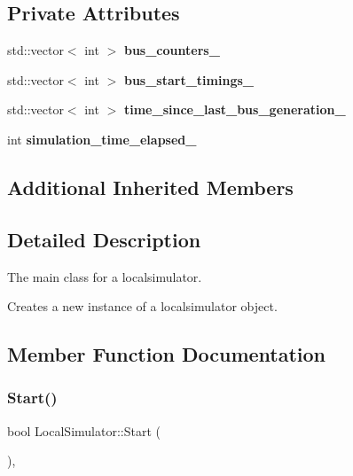 \subsection*{Private Attributes}
\begin{DoxyCompactItemize}
\item 
\mbox{\label{classLocalSimulator_a1c92b8c58df2b015753bd451bc469299}} 
std\+::vector$<$ int $>$ {\bfseries bus\+\_\+counters\+\_\+}
\item 
\mbox{\label{classLocalSimulator_afe5ff08ca4c982f774b6f924e2844689}} 
std\+::vector$<$ int $>$ {\bfseries bus\+\_\+start\+\_\+timings\+\_\+}
\item 
\mbox{\label{classLocalSimulator_a161826601c14be88063cb8b2d1bee552}} 
std\+::vector$<$ int $>$ {\bfseries time\+\_\+since\+\_\+last\+\_\+bus\+\_\+generation\+\_\+}
\item 
\mbox{\label{classLocalSimulator_a1acd308212f56e1d37eca95a2bc5d2f4}} 
int {\bfseries simulation\+\_\+time\+\_\+elapsed\+\_\+}
\end{DoxyCompactItemize}
\subsection*{Additional Inherited Members}


\subsection{Detailed Description}
The main class for a localsimulator. 

Creates a new instance of a localsimulator object. 

\subsection{Member Function Documentation}
\mbox{\label{classLocalSimulator_a380634942668855dd1da8276b270b362}} 
\subsubsection{\texorpdfstring{Start()}{Start()}}
{\footnotesize\ttfamily bool Local\+Simulator\+::\+Start (\begin{DoxyParamCaption}{ }\end{DoxyParamCaption})\hspace{0.3cm}{\ttfamily [override]}, {\ttfamily [virtual]}}



